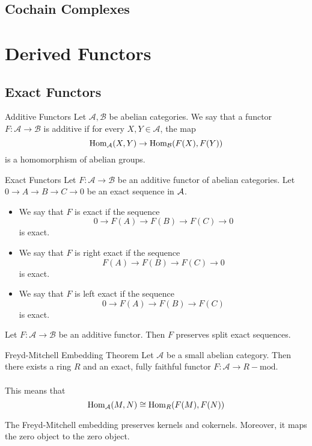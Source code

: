 \documentclass[a4paper]{article}
\begin{document}
\subsection{Cochain Complexes}

\pagebreak
\section{Derived Functors}
\subsection{Exact Functors}
\begin{defn}{Additive Functors}{} Let $\mathcal{A},\mathcal{B}$ be abelian categories. We say that a functor $F:\mathcal{A}\to\mathcal{B}$ is additive if for every $X,Y\in\mathcal{A}$, the map $$\operatorname{Hom}_\mathcal{A}(X,Y)\to\operatorname{Hom}_\mathcal{B}(F(X),F(Y))$$ is a homomorphism of abelian groups. 
\end{defn}

\begin{defn}{Exact Functors}{} Let $F:\mathcal{A}\to\mathcal{B}$ be an additive functor of abelian categories. Let $0\to A\to B\to C\to 0$ be an exact sequence in $\mathcal{A}$. 
\begin{itemize}
\item We say that $F$ is exact if the sequence $$0\to F(A)\to F(B)\to F(C)\to 0$$ is exact. 
\item We say that $F$ is right exact if the sequence $$F(A)\to F(B)\to F(C)\to 0$$ is exact. 
\item We say that $F$ is left exact if the sequence $$0\to F(A)\to F(B)\to F(C)$$ is exact. 
\end{itemize}
\end{defn}

\begin{prp}{}{} Let $F:\mathcal{A}\to\mathcal{B}$ be an additive functor. Then $F$ preserves split exact sequences. 
\end{prp}

\begin{thm}{Freyd-Mitchell Embedding Theorem}{} Let $\mathcal{A}$ be a small abelian category. Then there exists a ring $R$ and an exact, fully faithful functor $F:\mathcal{A}\to R-\text{mod}$. \\~\\
This means that $$\operatorname{Hom}_{\mathcal{A}}(M,N)\cong\operatorname{Hom}_R(F(M),F(N))$$
\end{thm}

\begin{lmm}{}{} The Freyd-Mitchell embedding preserves kernels and cokernels. Moreover, it maps the zero object to the zero object. 
\end{lmm}
\end{document}
